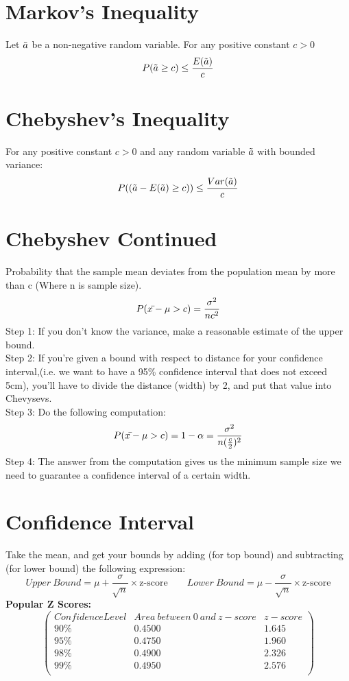 \documentclass[12pt,twoside]{article}
\newcommand{\rnd}{\Tilde}
\newcommand{\ra}{\rnd{ a}  }
\begin{document}
\section*{Markov’s Inequality}
Let $\ra$ be a non-negative random variable. For any positive
constant $c > 0$
\begin {equation}
     P (\ra \geq c) \leq \frac{E(\ra)}{c}
    \end {equation} 
    
\section*{Chebyshev's Inequality}
For any positive constant $c > 0$ and any random variable $\ra$ with bounded variance:
\begin{equation}
    P((\ra - E(\ra) \geq c)) \leq \frac{Var(\ra)}{c}
\end{equation}
\section*{Chebyshev Continued}
Probability that the sample mean deviates from the population mean by more than c (Where n is sample size).
\begin {equation} 
    P( x\Bar{}-\mu > c)= \frac{\sigma^2}{nc^2}
    \end {equation}
    Step 1: If you don't know the variance, make a reasonable estimate of the upper bound. \\
    Step 2: If you're given a bound with respect to distance for your confidence interval,(i.e. we want to have a 95\% confidence interval that does not exceed 5cm), you'll have to divide the distance (width) by 2, and put that value into Chevysevs.\\ 
    Step 3: Do the following computation:
    $$
      P( x\Bar{}-\mu > c)= 1 - \alpha =  \frac{\sigma^2}{n(\frac{c}{2})^2}  
    $$
    Step 4: The answer from the computation gives us the minimum sample size we need to guarantee a confidence interval of a certain width.
    

\section*{Confidence Interval}
Take the mean, and get your bounds by adding (for top bound) and subtracting (for lower bound) the following expression:
$$
   Upper \  Bound = \mu + \frac{\sigma}{\sqrt{n}} \times \text{z-score} \qquad Lower \ Bound = \mu - \frac{\sigma}{\sqrt{n}} \times \text{z-score}
$$
\textbf{Popular Z Scores:}
$$
\begin{pmatrix}
Confidence Level & Area \  between \  0 \ and \ z-score & z-score \\
90\%	& 0.4500	& 1.645 \\
95\%	& 0.4750	& 1.960 \\
98\%	& 0.4900	& 2.326 \\
99\%	& 0.4950	& 2.576 \\
\end{pmatrix}$$
\end{document}
